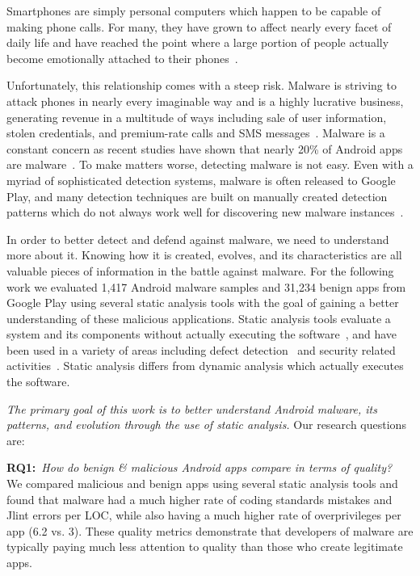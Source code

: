 \documentclass{sig-alternate}
\newcommand{\todo}[1]{\textcolor{cyan}{\textbf{[#1]}}}
\begin{document}
Smartphones are simply personal computers which happen to be capable of making phone calls. For many, they have grown to affect nearly every facet of daily life and have reached the point where a large portion of people actually become emotionally attached to their phones~\cite{thorsteinsson2014user}.

Unfortunately, this relationship comes with a steep risk. Malware is striving to attack phones in nearly every imaginable way and is a highly lucrative business, generating revenue in a multitude of ways including sale of user information, stolen credentials, and premium-rate calls and SMS messages~\cite{felt2011survey}. Malware is a constant concern as recent studies have shown that nearly 20\% of Android apps are malware~\cite{tynan_dan_report:_2015}. To make matters worse, detecting malware is not easy. Even with a myriad of sophisticated detection systems, malware is often released to Google Play, and many detection techniques are built on manually created detection patterns which do not always work well for discovering new malware instances~\cite{Zhou:2012:DAM:2310656.2310710}.

In order to better detect and defend against malware, we need to understand more about it. Knowing how it is created, evolves, and its characteristics are all valuable pieces of information in the battle against malware. For the following work we evaluated 1,417 Android malware samples and 31,234 benign apps from Google Play using several static analysis tools with the goal of gaining a better understanding of these malicious applications. Static analysis tools evaluate a system and its components without actually executing the software~\cite{159342}, and have been used in a variety of areas including defect detection~\cite{johnson2013don} and security related activities~\cite{song2015finding}. Static analysis differs from dynamic analysis which actually executes the software.


\emph{The primary goal of this work is to better understand Android malware, its patterns, and evolution through the use of static analysis.} Our research questions are:


\textbf{RQ1:}~\emph{How do benign \& malicious Android apps compare in terms of quality?}\\
We compared malicious and benign apps using several static analysis tools and found that malware had a much higher rate of coding standards mistakes and Jlint errors per LOC, while also having a much higher rate of overprivileges per app (6.2 vs. 3). These quality metrics demonstrate that developers of malware are typically paying much less attention to quality than those who create legitimate apps.
\end{document}

